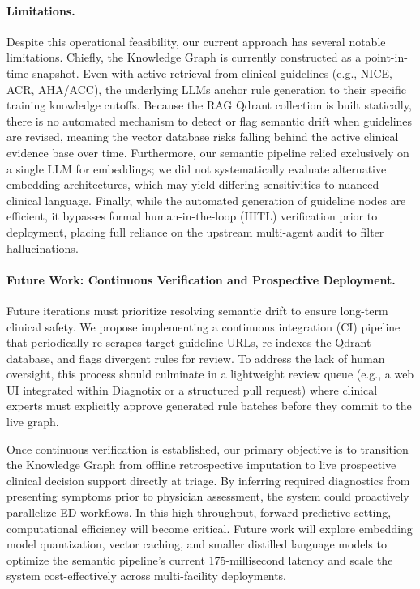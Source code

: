 \documentclass[pmlr]{jmlr}%
\begin{document}
\paragraph{Limitations.}
Despite this operational feasibility, our current approach has several notable limitations. Chiefly, the Knowledge Graph is currently constructed as a point-in-time snapshot. Even with active retrieval from clinical guidelines (e.g., NICE, ACR, AHA/ACC), the underlying LLMs anchor rule generation to their specific training knowledge cutoffs. Because the RAG Qdrant collection is built statically, there is no automated mechanism to detect or flag semantic drift when guidelines are revised, meaning the vector database risks falling behind the active clinical evidence base over time. Furthermore, our semantic pipeline relied exclusively on a single LLM for embeddings; we did not systematically evaluate alternative embedding architectures, which may yield differing sensitivities to nuanced clinical language. Finally, while the automated generation of guideline nodes are efficient, it bypasses formal human-in-the-loop (HITL) verification prior to deployment, placing full reliance on the upstream multi-agent audit to filter hallucinations.

\paragraph{Future Work: Continuous Verification and Prospective Deployment.}
Future iterations must prioritize resolving semantic drift to ensure long-term clinical safety. We propose implementing a continuous integration (CI) pipeline that periodically re-scrapes target guideline URLs, re-indexes the Qdrant database, and flags divergent rules for review. To address the lack of human oversight, this process should culminate in a lightweight review queue (e.g., a web UI integrated within Diagnotix or a structured pull request) where clinical experts must explicitly approve generated rule batches before they commit to the live graph.

Once continuous verification is established, our primary objective is to transition the Knowledge Graph from offline retrospective imputation to live prospective clinical decision support directly at triage. By inferring required diagnostics from presenting symptoms prior to physician assessment, the system could proactively parallelize ED workflows. In this high-throughput, forward-predictive setting, computational efficiency will become critical. Future work will explore embedding model quantization, vector caching, and smaller distilled language models to optimize the semantic pipeline's current 175-millisecond latency and scale the system cost-effectively across multi-facility deployments.
\end{document}
